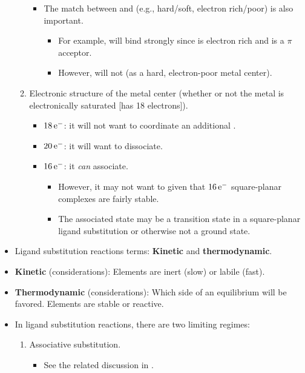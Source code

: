 \documentclass[../notes.tex]{subfiles}
\begin{document}
\begin{itemize}
\begin{enumerate}
\begin{itemize}
            \item The match between  and  (e.g., hard/soft, electron rich/poor) is also important.
            \begin{itemize}
                \item For example,  will bind  strongly since  is electron rich and  is a $\pi$ acceptor.
                \item However,  will not (as a hard, electron-poor metal center).
            \end{itemize}
        \end{itemize}
        \item Electronic structure of the metal center (whether or not the metal is electronically saturated [has 18 electrons]).
        \begin{itemize}
            \item $18\,\e[-]$: it will not want to coordinate an additional .
            \item $20\,\e[-]$: it will want to dissociate.
            \item $16\,\e[-]$: it \emph{can} associate.
            \begin{itemize}
                \item However, it may not want to given that $16\,\e[-]$ square-planar complexes are fairly stable.
                \item The associated state may be a transition state in a square-planar ligand substitution or otherwise not a ground state.
            \end{itemize}
        \end{itemize}
    \end{enumerate}
    \item Ligand substitution reactions terms: \textbf{Kinetic} and \textbf{thermodynamic}.
    \item \textbf{Kinetic} (considerations): Elements are inert (slow) or labile (fast).
    \item \textbf{Thermodynamic} (considerations): Which side of an equilibrium will be favored. Elements are stable or reactive.
    \item In ligand substitution reactions, there are two limiting regimes:
    \begin{enumerate}
        \item Associative substitution.
        \begin{itemize}
            \item See the related discussion in \textcite{bib:CHEM20100Notes}.

\end{itemize}
\end{enumerate}
\end{itemize}
\end{document}
